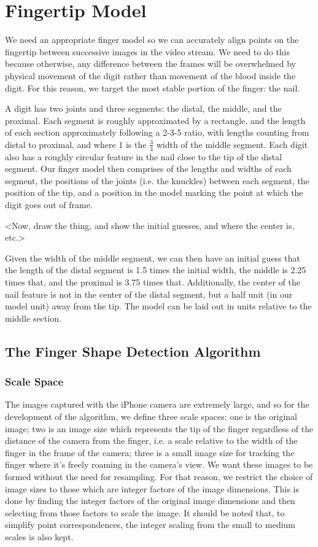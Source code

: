 \section{Fingertip Model}\label{sec:FingertipModel}

We need an appropriate finger model so we can accurately align points on the fingertip between successive images in the video stream. We need to do this because otherwise, any difference between the frames will be overwhelmed by physical movement of the digit rather than movement of the blood inside the digit. For this reason, we target the most stable portion of the finger: the nail.

A digit has two joints and three segments: the distal, the middle, and the proximal. Each segment is roughly approximated by a rectangle, and the length of each section approximately following a 2-3-5 ratio, with lengths counting from distal to proximal, and where 1 is the $\frac{3}{4}$ width of the middle segment. Each digit also has a roughly circular feature in the nail close to the tip of the distal segment. Our finger model then comprises of the lengths and widths of each segment, the positions of the joints (i.e. the knuckles) between each segment, the position of the tip, and a position in the model marking the point at which the digit goes out of frame. 

<Now, draw the thing, and show the initial guesses, and where the center is, etc.> 

Given the width of the middle segment, we can then have an initial guess that the length of the distal segment is 1.5 times the initial width, the middle is 2.25 times that, and the proximal is 3.75 times that. Additionally, the center of the nail feature is not in the center of the distal segment, but a half unit (in our model unit) away from the tip. The model can be laid out in units relative to the middle section.
\subsection{The Finger Shape Detection Algorithm}\label{sec:FingerShapeDetectionAlgorithm}

\subsubsection{Scale Space}\label{sec:ScaleSpace}
The images captured with the iPhone camera are extremely large, and so for the development of the algorithm, we define three scale spaces: one is the original image; two is an image size which represents the tip of the finger regardless of the distance of the camera from the finger, i.e. a scale relative to the width of the finger in the frame of the camera; three is a small image size for tracking the finger where it's freely roaming in the camera's view. We want these images to be formed without the need for resampling. For that reason, we restrict the choice of image sizes to those which are integer factors of the image dimensions. This is done by finding the integer factors of the original image dimensions and then selecting from those factors to scale the image. It should be noted that, to simplify point correspondences, the integer scaling from the small to medium scales is also kept.

